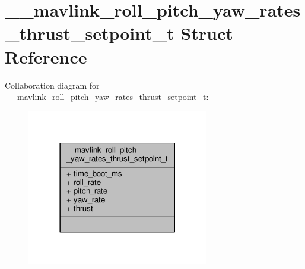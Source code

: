 \hypertarget{struct____mavlink__roll__pitch__yaw__rates__thrust__setpoint__t}{\section{\+\_\+\+\_\+mavlink\+\_\+roll\+\_\+pitch\+\_\+yaw\+\_\+rates\+\_\+thrust\+\_\+setpoint\+\_\+t Struct Reference}
\label{struct____mavlink__roll__pitch__yaw__rates__thrust__setpoint__t}
}


Collaboration diagram for \+\_\+\+\_\+mavlink\+\_\+roll\+\_\+pitch\+\_\+yaw\+\_\+rates\+\_\+thrust\+\_\+setpoint\+\_\+t\+:
\nopagebreak
\begin{figure}[H]
\begin{center}
\leavevmode
\includegraphics[width=225pt]{struct____mavlink__roll__pitch__yaw__rates__thrust__setpoint__t__coll__graph}
\end{center}
\end{figure}
